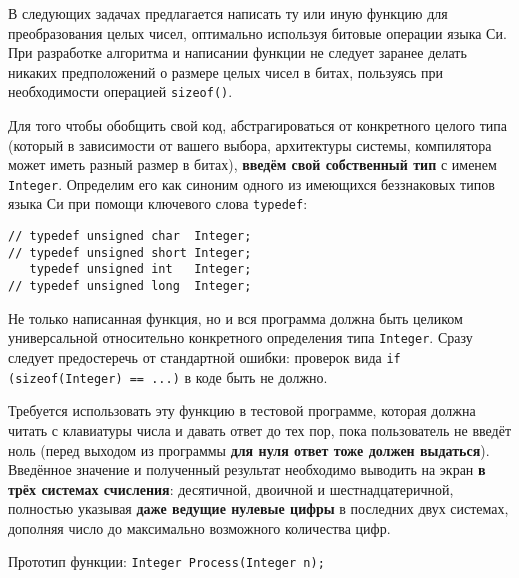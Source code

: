 
В следующих задачах предлагается написать ту или иную функцию для
преобразования целых чисел, оптимально используя битовые операции языка Си.
При разработке алгоритма и написании функции не следует заранее делать никаких
предположений о размере целых чисел в битах, пользуясь при необходимости
операцией \texttt{sizeof()}.

Для того чтобы обобщить свой код, абстрагироваться от конкретного целого типа
(который в зависимости от вашего выбора, архитектуры системы, компилятора
может иметь разный размер в битах), \textbf{введём свой собственный тип} с
именем \texttt{Integer}. Определим его как синоним одного из имеющихся
беззнаковых типов языка Си при помощи ключевого слова \texttt{typedef}:

\medskip
\begin{verbatim}
// typedef unsigned char  Integer;
// typedef unsigned short Integer;
   typedef unsigned int   Integer;
// typedef unsigned long  Integer;
\end{verbatim}
\medskip

Не только написанная функция, но и вся программа должна быть целиком
универсальной относительно конкретного определения типа \texttt{Integer}.
Сразу следует предостеречь от стандартной ошибки: проверок вида
\texttt{if (sizeof(Integer) == ...)} в коде быть не должно.

Требуется использовать эту функцию в тестовой программе, которая должна читать
с клавиатуры числа и давать ответ до тех пор, пока пользователь не введёт ноль
(перед выходом из программы \textbf{для нуля ответ тоже должен выдаться}).
Введённое значение и полученный результат необходимо выводить на экран
\textbf{в трёх системах счисления}: десятичной, двоичной и шестнадцатеричной,
полностью указывая \textbf{даже ведущие нулевые цифры} в последних двух
системах, дополняя число до максимально возможного количества цифр.

Прототип функции: \texttt{Integer Process(Integer n);}


